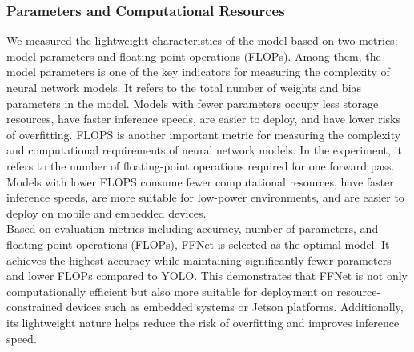 \subsubsection{Parameters and Computational Resources}
We measured the lightweight characteristics of the model based on two metrics: model parameters and floating-point operations (FLOPs). Among them, the model parameters is one of the key indicators for measuring the complexity of neural network models. It refers to the total number of weights and bias parameters in the model. Models with fewer parameters occupy less storage resources, have faster inference speeds, are easier to deploy, and have lower risks of overfitting. FLOPS is another important metric for measuring the complexity and computational requirements of neural network models. In the experiment, it refers to the number of floating-point operations required for one forward pass. Models with lower FLOPS consume fewer computational resources, have faster inference speeds, are more suitable for low-power environments, and are easier to deploy on mobile and embedded devices.\\
Based on evaluation metrics including accuracy, number of parameters, and floating-point operations (FLOPs), FFNet is selected as the optimal model. It achieves the highest accuracy while maintaining significantly fewer parameters and lower FLOPs compared to YOLO. This demonstrates that FFNet is not only computationally efficient but also more suitable for deployment on resource-constrained devices such as embedded systems or Jetson platforms. Additionally, its lightweight nature helps reduce the risk of overfitting and improves inference speed.
